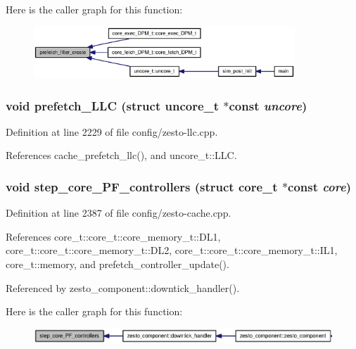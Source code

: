 Here is the caller graph for this function:\nopagebreak
\begin{figure}[H]
\begin{center}
\leavevmode
\includegraphics[width=278pt]{zesto-cache_8h_81be4d7fbc22a3d9f3fcaa52715c22e9_icgraph}
\end{center}
\end{figure}
\subsubsection[{prefetch\_\-LLC}]{\setlength{\rightskip}{0pt plus 5cm}void prefetch\_\-LLC (struct {\bf uncore\_\-t} $\ast$const  {\em uncore})}\label{zesto-cache_8h_8ed5f90d7b07bddefbf6736b13da8eb2}




Definition at line 2229 of file config/zesto-llc.cpp.

References cache\_\-prefetch\_\-llc(), and uncore\_\-t::LLC.
\subsubsection[{step\_\-core\_\-PF\_\-controllers}]{\setlength{\rightskip}{0pt plus 5cm}void step\_\-core\_\-PF\_\-controllers (struct {\bf core\_\-t} $\ast$const  {\em core})}\label{zesto-cache_8h_66309167ab5b4ca25ad2bfbf94b0126b}




Definition at line 2387 of file config/zesto-cache.cpp.

References core\_\-t::core\_\-t::core\_\-memory\_\-t::DL1, core\_\-t::core\_\-t::core\_\-memory\_\-t::DL2, core\_\-t::core\_\-t::core\_\-memory\_\-t::IL1, core\_\-t::memory, and prefetch\_\-controller\_\-update().

Referenced by zesto\_\-component::downtick\_\-handler().

Here is the caller graph for this function:\nopagebreak
\begin{figure}[H]
\begin{center}
\leavevmode
\includegraphics[width=335pt]{zesto-cache_8h_66309167ab5b4ca25ad2bfbf94b0126b_icgraph}
\end{center}
\end{figure}
